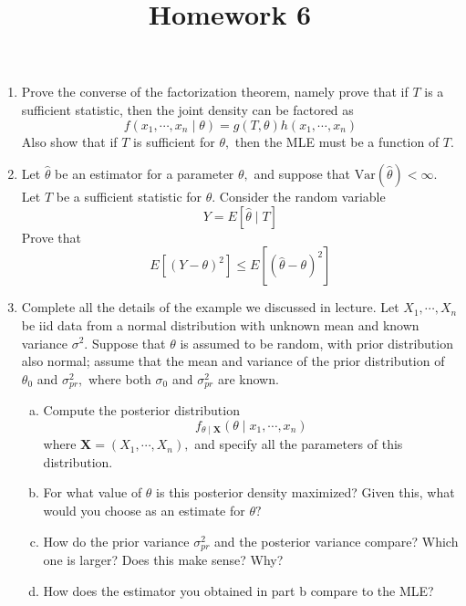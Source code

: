\documentclass{article}
\newcommand{\var}{\mathrm{Var}}
\begin{document}
\title{Homework 6}
\maketitle
\thispagestyle{fancy}

\begin{enumerate}
	\item Prove the converse of the factorization theorem, namely prove that if $T$ is a sufficient statistic, then the joint density can be factored as \[f(x_1, \cdots, x_n\mid\theta)=g(T, \theta)h(x_1, \cdots, x_n)\] Also show that if $T$ is sufficient for $\theta,$ then the MLE must be a function of $T.$

	\item Let $\hat{\theta}$ be an estimator for a parameter $\theta,$ and suppose that $\var(\hat{\theta})<\infty.$ Let $T$ be a sufficient statistic for $\theta.$ Consider the random variable \[Y=E[\hat{\theta}\mid T]\] Prove that \[E\left[ \left( Y-\theta \right)^2 \right]\le E\left[ \left( \hat{\theta}-\theta \right)^2 \right]\]

	\item Complete all the details of the example we discussed in lecture. Let $X_1, \cdots, X_n$ be iid data from a normal distribution with unknown mean and known variance $\sigma^2.$ Suppose that $\theta$ is assumed to be random, with prior distribution also normal; assume that the mean and variance of the prior distribution of $\theta_0$ and $\sigma_{pr}^2,$ where both $\sigma_0$ and $\sigma_{pr}^2$ are known.

		\begin{enumerate}[(a)]
			\item Compute the posterior distribution \[f_{\theta\mid\bm{X}} (\theta\mid x_1, \cdots, x_n)\] where $\bm{X}=(X_1, \cdots, X_n),$ and specify all the parameters of this distribution.

			\item For what value of $\theta$ is this posterior density maximized? Given this, what would you choose as an estimate for $\theta?$

			\item How do the prior variance $\sigma_{pr}^2$ and the posterior variance compare? Which one is larger? Does this make sense? Why?

			\item How does the estimator you obtained in part b compare to the MLE?
				
		\end{enumerate}


\end{enumerate}
\end{document}
